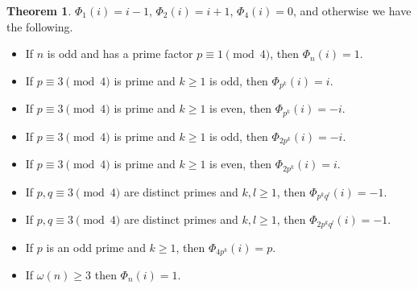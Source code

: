 \documentclass{article}
\theoremstyle{definition}
\newtheorem{theorem}{Theorem}
\theoremstyle{definition}
\begin{document}
\begin{theorem}
$\Phi_1(i)=i-1$, $\Phi_2(i) = i+1$, $\Phi_4(i)=0$, and otherwise
we have the following.

\begin{itemize}
\item If $n$ is odd and has a prime factor $p \equiv 1 \pmod{4}$, then $\Phi_n(i)=1$.
\item If $p \equiv 3 \pmod{4}$ is prime and $k \geq 1$ is odd, then
$\Phi_{p^k}(i) = i$.
\item If $p \equiv 3 \pmod{4}$ is prime and $k \geq 1$ is even, then
$\Phi_{p^k}(i) = -i$.
\item If $p \equiv 3 \pmod{4}$ is prime and $k \geq 1$ is odd, then
$\Phi_{2p^k}(i)=-i$. 
\item If $p \equiv 3 \pmod{4}$ is prime and $k \geq 1$ is even, then
$\Phi_{2p^k}(i)=i$.
\item If $p,q \equiv 3 \pmod{4}$ are distinct primes and $k, l \geq 1$, then
$\Phi_{p^k q^l}(i) = -1$.
\item If $p,q \equiv 3 \pmod{4}$ are distinct primes and $k, l \geq 1$, then
$\Phi_{2p^k q^l}(i) = -1$.
\item If $p$ is an odd prime and $k \geq 1$, then $\Phi_{4p^k}(i)=p$. 
\item If $\omega(n) \geq 3$ then $\Phi_n(i)=1$. 
\end{itemize}
\end{theorem}
\end{document}
